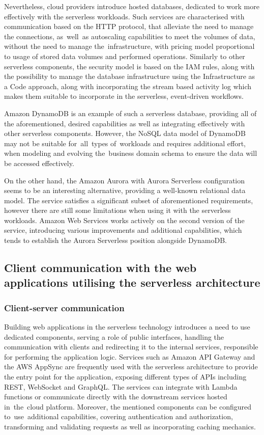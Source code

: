Nevertheless, cloud providers introduce hosted databases, dedicated to work more effectively with the serverless workloads.
Such services are characterised with communication based on the HTTP protocol, that alleviate the need to manage the connections, as~well~as autoscaling capabilities to meet the volumes of data, without the need to manage the~infrastructure, with pricing model proportional to usage of stored data volumes and performed operations.
Similarly to other serverless components, the security model is based on the IAM rules, along with the possibility to manage the database infrastructure using the Infrastructure as a Code approach, along with incorporating the stream based activity log which makes them suitable to incorporate in the serverless, event-driven workflows.

Amazon DynamoDB is an example of such a serverless database, providing all of the aforementioned, desired capabilities as well as integrating effectively with other serverless components.
However, the NoSQL data model of DynamoDB may not be suitable for~all~types of~workloads and requires additional effort, when modeling and evolving the~business domain schema to ensure the data will be accessed effectively.

On the other hand, the Amazon Aurora with Aurora Serverless configuration seems to be an interesting alternative, providing a well-known relational data model.
The service satisfies a significant subset of aforementioned requirements, however there are still some limitations when using it with the serverless workloads.
Amazon Web Services works actively on the second version of the service, introducing various improvements and additional capabilities, which tends to establish the Aurora Serverless position alongside DynamoDB.

\subsection{Client communication with the web applications utilising the serverless architecture}

\subsubsection{Client-server communication}

Building web applications in the serverless technology introduces a need to use dedicated components, serving a role of public interfaces, handling the communication with clients and redirecting it to the internal services, responsible for performing the application logic.
Services such as Amazon API Gateway and the AWS AppSync are frequently used with the serverless architecture to provide the entry point for the application, exposing different types of APIs including REST, WebSocket and GraphQL.
The services can integrate with Lambda functions or communicate directly with the downstream services hosted in~the~cloud platform. 
Moreover, the mentioned components can be configured to~use~additional capabilities, covering authentication and authorization, transforming and validating requests as well as incorporating caching mechanics.

